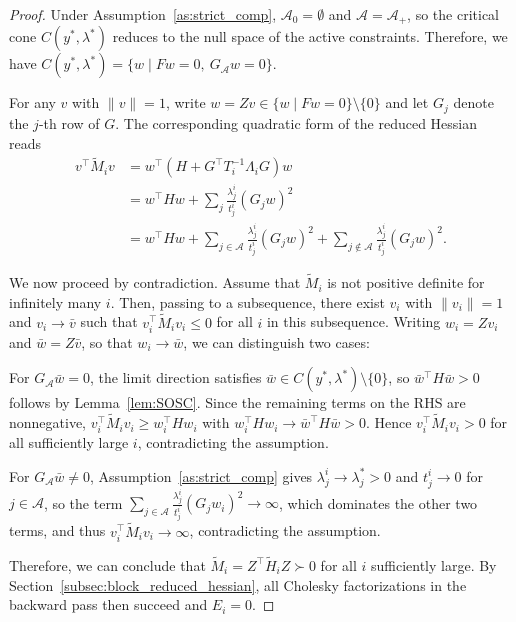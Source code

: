 \documentclass[class=scrbook, crop=false]{standalone}
\begin{document}
\begin{proof}
    Under Assumption~\ref{as:strict_comp}, $\mathcal{A}_0 = \emptyset$ and $\mathcal{A} = \mathcal{A}_+$,
    so the critical cone $C(y^*,\lambda^*)$ reduces to the null space of the active constraints.
    Therefore, we have $C(y^*,\lambda^*) = \{w \mid F w = 0,\ G_{\mathcal{A}} w = 0\}$.

    For any $v$ with $\|v\| = 1$, write $w = Zv \in \{w \mid Fw = 0\} \setminus \{0\}$
    and let $G_j$ denote the $j$-th row of $G$.
    The corresponding quadratic form of the reduced Hessian reads
    \begin{align*}
        v^\top \tilde{M}_i v &= w^\top (H + G^\top T_i^{-1} \Lambda_i  G) w \\
                             &= w^\top H w + \sum_{j} \frac{\lambda_j^i}{t_j^i} (G_j w)^2 \\
                             &= w^\top H w + \sum_{j \in \mathcal{A}} \frac{\lambda_j^i}{t_j^i} (G_j w)^2 + \sum_{j \notin \mathcal{A}} \frac{\lambda_j^i}{t_j^i} (G_j w)^2.
    \end{align*}

    We now proceed by contradiction. Assume that $\tilde{M}_i$ is not positive definite for infinitely many $i$.
    Then, passing to a subsequence, there exist $v_i$ with $\|v_i\| = 1$ and $v_i \to \bar{v}$
    such that $v_i^\top \tilde{M}_i v_i \leq 0$ for all $i$ in this subsequence.
    Writing $w_i = Z v_i$ and $\bar{w} = Z \bar{v}$, so that $w_i \to \bar{w}$, we can distinguish two cases:

    For $G_{\mathcal{A}}\bar{w}=0$, the limit direction satisfies $\bar{w} \in C(y^*,\lambda^*) \setminus \{0\}$,
    so $\bar{w}^\top H \bar{w} > 0$ follows by Lemma~\ref{lem:SOSC}.
    Since the remaining terms on the \gls{RHS} are nonnegative, $v_i^\top \tilde{M}_i v_i \ge w_i^\top H w_i$ 
    with $w_i^\top H w_i \to \bar{w}^\top H \bar{w} > 0$.
    Hence $v_i^\top \tilde{M}_i v_i > 0$ for all sufficiently large $i$, contradicting the assumption.

    For $G_{\mathcal{A}}\bar{w} \neq 0$, Assumption~\ref{as:strict_comp} gives $\lambda_j^i \to \lambda_j^* > 0$ and $t_j^i \to 0$ for $j \in \mathcal{A}$,
    so the term $\sum_{j \in \mathcal{A}} \frac{\lambda_j^i}{t_j^i} (G_j w_i)^2 \rightarrow \infty$, 
    which dominates the other two terms, and thus $v_i^\top \tilde{M}_i v_i \rightarrow \infty$, contradicting the assumption.

    Therefore, we can conclude that $\tilde{M}_i = Z^\top \tilde{H}_i Z \succ 0$ for all $i$ sufficiently large.
    By Section~\ref{subsec:block_reduced_hessian}, all Cholesky factorizations in the backward pass then succeed and $E_i = 0$.
\end{proof}
\end{document}

